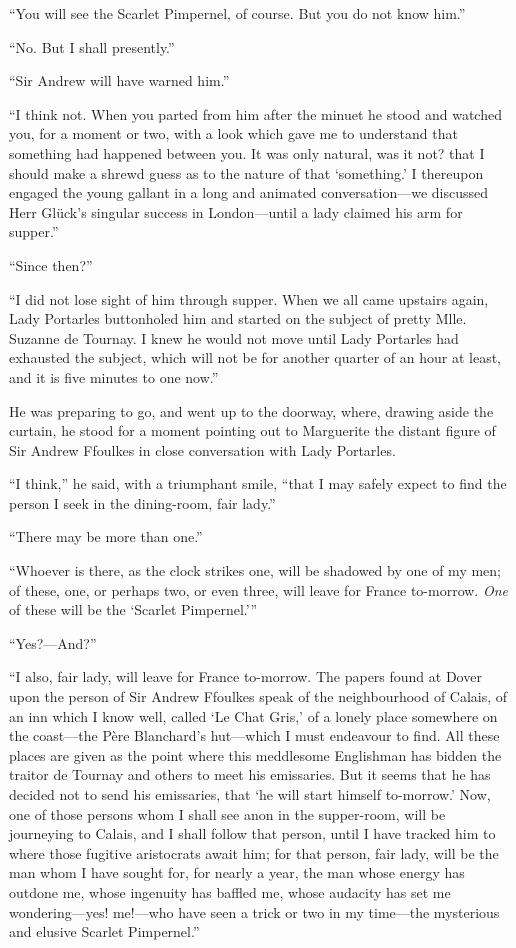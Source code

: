 \enquote{You will see the Scarlet Pimpernel, of course. But you do not know him.}

\enquote{No. But I shall presently.}

\enquote{Sir Andrew will have warned him.}

\enquote{I think not. When you parted from him after the minuet he stood and watched you, for a moment or two, with a look which gave me to understand that something had happened between you. It was only natural, was it not? that I should make a shrewd guess as to the nature of that \enquote{something.} I thereupon engaged the young gallant in a long and animated conversation---we discussed Herr Glück's singular success in London---until a lady claimed his arm for supper.}

\enquote{Since then?}

\enquote{I did not lose sight of him through supper. When we all came upstairs again, Lady Portarles buttonholed him and started on the subject of pretty Mlle. Suzanne de Tournay. I knew he would not move until Lady Portarles had exhausted the subject, which will not be for another quarter of an hour at least, and it is five minutes to one now.}

He was preparing to go, and went up to the doorway, where, drawing aside the curtain, he stood for a moment pointing out to Marguerite the distant figure of Sir Andrew Ffoulkes in close conversation with Lady Portarles.

\enquote{I think,} he said, with a triumphant smile, \enquote{that I may safely expect to find the person I seek in the dining-room, fair lady.}

\enquote{There may be more than one.}

\enquote{Whoever is there, as the clock strikes one, will be shadowed by one of my men; of these, one, or perhaps two, or even three, will leave for France to-morrow. \textit{One} of these will be the \enquote{Scarlet Pimpernel.}}

\enquote{Yes?---And?}

\enquote{I also, fair lady, will leave for France to-morrow. The papers found at Dover upon the person of Sir Andrew Ffoulkes speak of the neighbourhood of Calais, of an inn which I know well, called \enquote{Le Chat Gris,} of a lonely place somewhere on the coast---the Père Blanchard's hut---which I must endeavour to find. All these places are given as the point where this meddlesome Englishman has bidden the traitor de Tournay and others to meet his emissaries. But it seems that he has decided not to send his emissaries, that \enquote{he will start himself to-morrow.} Now, one of those persons whom I shall see anon in the supper-room, will be journeying to Calais, and I shall follow that person, until I have tracked him to where those fugitive aristocrats await him; for that person, fair lady, will be the man whom I have sought for, for nearly a year, the man whose energy has outdone me, whose ingenuity has baffled me, whose audacity has set me wondering---yes! me!---who have seen a trick or two in my time---the mysterious and elusive Scarlet Pimpernel.}

